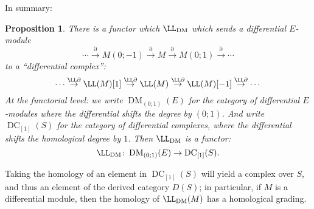 \documentclass[12pt]{amsart}
\newtheorem{prop}[lemma]{Proposition}
\theoremstyle{definition}
\theoremstyle{remark}
\def\DM{\operatorname{DM}}
\def\DC{\operatorname{DC}}
\begin{document}
In summary:
\begin{prop}
There is a functor which $\LL_{\DM}$ which sends a differential $E$-module
\[
\cdots\overset{\partial}{\to}  M(0;-1) \overset{\partial}{\to} M \overset{\partial}{\to} M(0;1)\overset{\partial}{\to} \cdots
 \]
to a ``differential complex'':
\[
\cdots\overset{\LL \partial}{\to}  \LL(M)[1] \overset{\LL \partial}{\to} \LL(M) \overset{\LL \partial}{\to}  \LL(M)[-1]\overset{\LL \partial}{\to} \cdots
\]
At the functorial level:  we write $\DM_{(0;1)}(E)$ for the category of differential $E$-modules where the differential shifts the degree by $(0;1)$.   And write $\DC_{[1]}(S)$ for the category of differential complexes, where the differential shifts the {\em homological} degree by $1$.  Then $\LL_{\DM}$ is a functor:
\[
\LL_{\DM}\colon \DM_{(0;1)}(E)\to \DC_{[1]}(S).
\]
\end{prop}
Taking the homology of an element in $\DC_{[1]}(S)$ will yield a complex over $S$, and thus an element of the derived category $D(S)$; in particular, if $M$ is a differential module, then the homology of $\LL_{\DM}(M)$ has a homological grading.  
\end{document}
